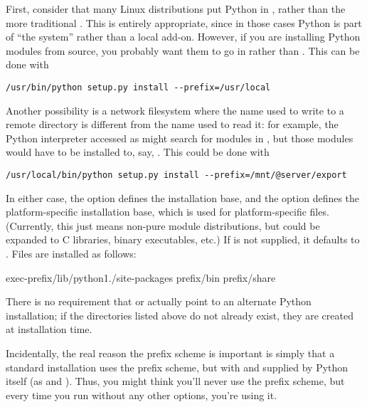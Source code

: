 \documentclass{howto}
\begin{document}
First, consider that many Linux distributions put Python in ,
rather than the more traditional .  This is entirely
appropriate, since in those cases Python is part of ``the system''
rather than a local add-on.  However, if you are installing Python
modules from source, you probably want them to go in
 rather than
.  This can be done with

\begin{verbatim}
/usr/bin/python setup.py install --prefix=/usr/local
\end{verbatim}

Another possibility is a network filesystem where the name used to write
to a remote directory is different from the name used to read it: for
example, the Python interpreter accessed as 
might search for modules in ,
but those modules would have to be installed to, say,
.  This
could be done with

\begin{verbatim}
/usr/local/bin/python setup.py install --prefix=/mnt/@server/export
\end{verbatim}

In either case, the  option defines the
installation base, and the  option defines
the platform-specific installation base, which is used for
platform-specific files.  (Currently, this just means non-pure module
distributions, but could be expanded to C libraries, binary executables,
etc.)  If  is not supplied, it defaults to
.  Files are installed as follows:

              {exec-prefix}{/lib/python1./site-packages}
              {prefix}{/bin}
              {prefix}{/share}

There is no requirement that  or
 actually point to an alternate Python
installation; if the directories listed above do not already exist, they
are created at installation time.

Incidentally, the real reason the prefix scheme is important is simply
that a standard \UNIX{} installation uses the prefix scheme, but with
 and  supplied by
Python itself (as  and ).  Thus,
you might think you'll never use the prefix scheme, but every time you
run  without any other options, you're
using it.
\end{document}
